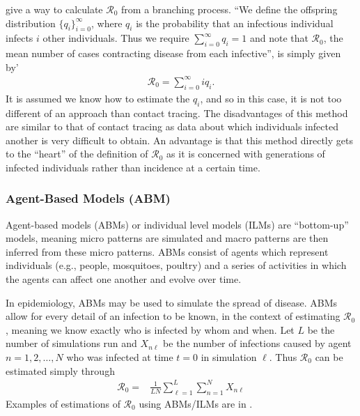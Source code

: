 \documentclass[12pt]{article}
\newcommand{\rr}{\ensuremath{\mathcal{R}_0}}
\begin{document}
\cite{getz2006} give a way to calculate $\rr$ from a branching process.  ``We define the offspring distribution $\{q_i \}_{i=0}^\infty$, where $q_i$  is the probability that an infectious individual infects $i$ other individuals.  Thus we require $\sum_{i=0}^\infty q_i =1$ and note that $\rr$, the mean number of cases contracting disease from each infective'', is simply given by'
  \begin{align*}
    \rr = \sum_{i=0}^\infty iq_i.
  \end{align*}
  It is assumed we know how to estimate the $q_i$, and so in this case, it is not too different of an approach than contact tracing.  The disadvantages of this method are similar to that of contact tracing as data about which individuals  infected another is very difficult to obtain.  An advantage is that this method directly gets to the ``heart'' of the definition of $\rr$ as it is concerned with generations of infected individuals rather than incidence at a certain time.


    

\subsubsection{Agent-Based Models (ABM)}
\label{sec:agent-based-models}
Agent-based models (ABMs) or individual level models (ILMs) are ``bottom-up'' models, meaning micro patterns are simulated and macro patterns are then inferred from these micro patterns.  ABMs consist of agents which represent individuals (e.g., people, mosquitoes, poultry) and a series of activities in which the agents can affect one another and evolve over time.

In epidemiology, ABMs may be used to simulate the spread of disease.  ABMs allow for every detail of an infection to be known, in the context of estimating $\rr$, meaning we know exactly who is infected by whom and when.  Let $L$ be the number of simulations run and $X_{n \ell}$ be the number of infections caused by agent $n = 1, 2, \dots, N$ who was infected at time $t=0$ in simulation $\ell$.   Thus $\rr$ can be estimated simply through
\begin{align*}
  \rr =& \frac{1}{LN}\sum_{\ell =1}^L\sum_{n=1}^NX_{n \ell}
\end{align*}
Examples of estimations of $\rr$ using ABMs/ILMs are in \cite{breban2007,ahmed2013variance}.
\end{document}
